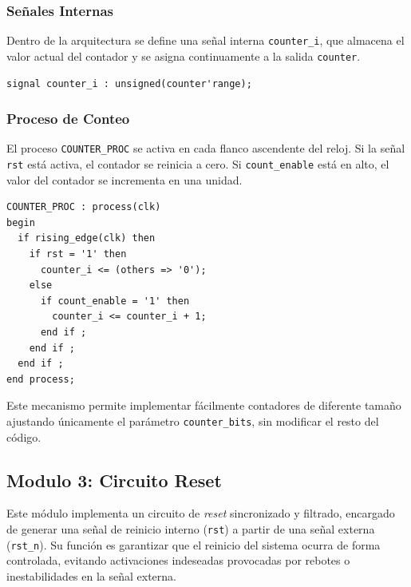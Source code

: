 \documentclass[a4paper,12pt]{article}
\begin{document}
\subsubsection{Señales Internas}

Dentro de la arquitectura se define una señal interna \texttt{counter\_i}, que almacena el valor actual del contador y se asigna continuamente a la salida \texttt{counter}.

\begin{lstlisting}[caption={Definición de señal interna del contador}, label={lst:counter_signal}]
signal counter_i : unsigned(counter'range);
\end{lstlisting}

\subsubsection{Proceso de Conteo}

El proceso \texttt{COUNTER\_PROC} se activa en cada flanco ascendente del reloj. Si la señal \texttt{rst} está activa, el contador se reinicia a cero. Si \texttt{count\_enable} está en alto, el valor del contador se incrementa en una unidad.

\begin{lstlisting}[caption={Proceso de conteo}, label={lst:counter_proc}]
COUNTER_PROC : process(clk)
begin
  if rising_edge(clk) then  
    if rst = '1' then
      counter_i <= (others => '0');
    else
      if count_enable = '1' then
        counter_i <= counter_i + 1;
      end if ;
    end if ;
  end if ;
end process;
\end{lstlisting}

Este mecanismo permite implementar fácilmente contadores de diferente tamaño ajustando únicamente el parámetro \texttt{counter\_bits}, sin modificar el resto del código.


\subsection{Modulo 3: Circuito Reset}

Este módulo implementa un circuito de \textit{reset} sincronizado y filtrado, encargado de generar una señal de reinicio interno (\texttt{rst}) a partir de una señal externa (\texttt{rst\_n}). Su función es garantizar que el reinicio del sistema ocurra de forma controlada, evitando activaciones indeseadas provocadas por rebotes o inestabilidades en la señal externa.

\newpage
\end{document}
